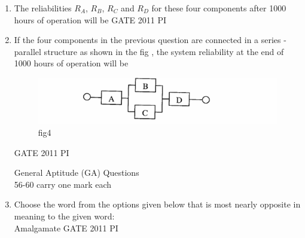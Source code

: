 \documentclass[journal,12pt,onecolumn]{IEEEtran}
\theoremstyle{remark}
\begin{document}
\begin{enumerate}
\item The reliabilities $R_A$, $R_B$, $R_C$ and $R_D$ for these four components after 1000 hours of operation will be
\hfill{GATE 2011 PI}
\begin{enumerate}
\end{enumerate}
\item 
If the four components in the previous question are connected in a series -parallel structure as shown in the fig , the system reliability at the end of 1000 hours of operation will be
\begin{figure}[H]
    \centering
    \includegraphics[width=0.5\linewidth]{figs/Q.55.png}
    \caption{fig4}
    \label{fig:figs/Q.55.png}
\end{figure}
\hfill{GATE 2011 PI}
\begin{enumerate}
\end{enumerate}
General Aptitude (GA) Questions\\
56-60 carry one mark each
\item Choose the word from the options given below that is most nearly opposite in meaning to the given word: \\
Amalgamate
\hfill{GATE 2011 PI}
\begin{enumerate}
\end{enumerate}


\end{enumerate}
\end{document}
